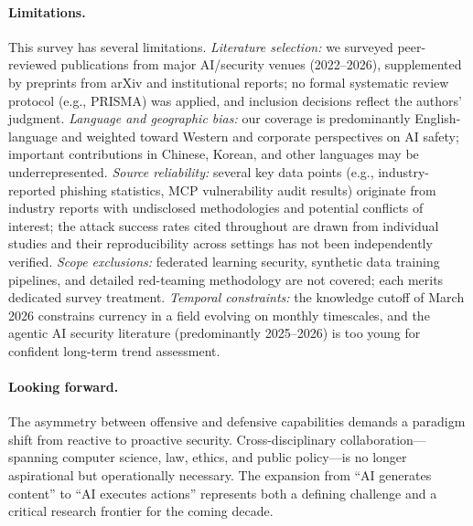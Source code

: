 \paragraph{Limitations.}
This survey has several limitations. \emph{Literature selection:} we surveyed peer-reviewed publications from major AI/security venues (2022--2026), supplemented by preprints from arXiv and institutional reports; no formal systematic review protocol (e.g., PRISMA) was applied, and inclusion decisions reflect the authors' judgment. \emph{Language and geographic bias:} our coverage is predominantly English-language and weighted toward Western and corporate perspectives on AI safety; important contributions in Chinese, Korean, and other languages may be underrepresented. \emph{Source reliability:} several key data points (e.g., industry-reported phishing statistics, MCP vulnerability audit results) originate from industry reports with undisclosed methodologies and potential conflicts of interest; the attack success rates cited throughout are drawn from individual studies and their reproducibility across settings has not been independently verified. \emph{Scope exclusions:} federated learning security, synthetic data training pipelines, and detailed red-teaming methodology are not covered; each merits dedicated survey treatment. \emph{Temporal constraints:} the knowledge cutoff of March 2026 constrains currency in a field evolving on monthly timescales, and the agentic AI security literature (predominantly 2025--2026) is too young for confident long-term trend assessment.

\paragraph{Looking forward.}
The asymmetry between offensive and defensive capabilities demands a paradigm shift from reactive to proactive security. Cross-disciplinary collaboration---spanning computer science, law, ethics, and public policy---is no longer aspirational but operationally necessary. The expansion from ``AI generates content'' to ``AI executes actions'' represents both a defining challenge and a critical research frontier for the coming decade.
